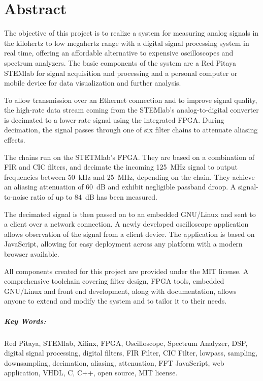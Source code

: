 %
%
\chapter*{Abstract} %
\label{ch:app:abstract}

The objective  of this  project is  to realize a  system for  measuring analog
signals  in  the kilohertz  to  low  megahertz  range  with a  digital  signal
processing  system  in  real  time,  offering  an  affordable  alternative  to
expensive oscilloscopes  and spectrum  analyzers. The basic components  of the
system are a  Red Pitaya STEMlab for signal acquisition  and processing  and a
personal  computer  or  mobile  device  for  data  visualization  and  further
analysis.

To  allow transmission  over  an  Ethernet connection  and  to improve  signal
quality, the high-rate data stream coming from the STEMlab's analog-to-digital
converter  is   decimated  to  a   lower-rate  signal  using   the  integrated
FPGA. During decimation, the signal passes through one of six filter chains to
attenuate aliasing  effects. 

The chains  run on  the STETMlab's  FPGA. They are based  on a  combination of
FIR  and CIC  filters,  and  decimate the  incoming  \SI{125}{\MHz} signal  to
output frequencies  between \SI{50}{\kHz} and \SI{25}{\MHz},  depending on the
chain. They  achieve  an  aliasing  attenuation of  \SI{60}{\dB}  and  exhibit
negligible passband droop. A  signal-to-noise ratio of up  to \SI{84}{\dB} has
been measured.

The decimated signal is then passed on  to an embedded GNU/Linux and sent to a
client over  a network connection. A newly  developed oscilloscope application
allows observation  of the signal  from a  client device.  The  application is
based on JavaScript,  allowing for easy deployment across any  platform with a
modern browser available.

All components created for this project  are provided under the MIT license. A
comprehensive toolchain covering filter design, FPGA tools, embedded GNU/Linux
and front end  development, along with documentation, allows  anyone to extend
and modify the system and to tailor it to their needs.

\vfill

\paragraph{Key Words:} 
Red Pitaya,
STEMlab,
Xilinx,
FPGA,
Oscilloscope,
Spectrum Analyzer,
DSP,
digital signal processing,
digital filters,
FIR Filter,
CIC Filter,
lowpass,
sampling,
downsampling,
decimation,
aliasing,
attenuation,
FFT
JavaScript,
web application,
VHDL,
C,
C++,
open source,
MIT license.
